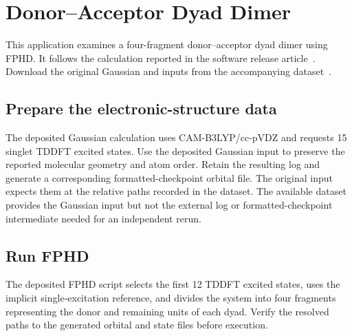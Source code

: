 \section{Donor--Acceptor Dyad Dimer}\label{sec-tut-dyad}
This application examines a four-fragment donor--acceptor dyad dimer using FPHD. It follows the calculation reported in the software release article~\cite{Diabat2026}. Download the original Gaussian and \progname{} inputs from the accompanying dataset~\cite{DiabatPaperData2026}.

\subsection{Prepare the electronic-structure data}
The deposited Gaussian calculation uses CAM-B3LYP/cc-pVDZ and requests 15 singlet TDDFT excited states. Use the deposited Gaussian input to preserve the reported molecular geometry and atom order. Retain the resulting log and generate a corresponding formatted-checkpoint orbital file. The original \progname{} input expects them at the relative paths recorded in the dataset. The available dataset provides the Gaussian input but not the external log or formatted-checkpoint intermediate needed for an independent rerun.

\subsection{Run FPHD}
The deposited FPHD script selects the first 12 TDDFT excited states, uses the implicit single-excitation reference, and divides the system into four fragments representing the donor and remaining units of each dyad. Verify the resolved paths to the generated orbital and state files before execution.

